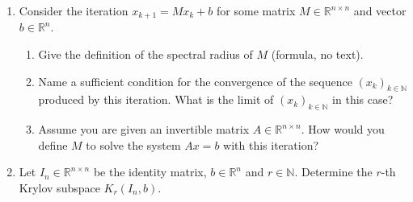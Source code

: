 \vspace*{-0.5cm}
\begin{enumerate}
	\item Consider the iteration $x_{k+1} = Mx_k + b$ for some matrix $M \in \mathbb{R}^{n \times n}$ and vector $b \in \mathbb{R}^n$. 
	\begin{enumerate}
		\item Give the definition of the spectral radius of $M$ (formula, no text).
		\item Name a sufficient condition for the convergence of the sequence $(x_k)_{k\in\mathbb{N}}$ produced by this iteration. What is the limit of $(x_k)_{k\in\mathbb{N}}$ in this case?
		\item Assume you are given an invertible matrix $A \in \mathbb{R}^{n \times n}$. How would you define $M$ to solve the system $Ax=b$ with this iteration?
	\end{enumerate}
	\item Let $I_n \in \mathbb{R}^{n \times n}$ be the identity matrix, $b\in \mathbb{R}^{n}$ and $r\in \mathbb{N}$. Determine the $r$-th Krylov subspace $K_r(I_n,b)$. 
\end{enumerate}
 